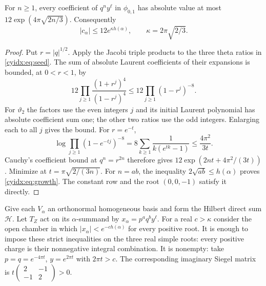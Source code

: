 \begin{lemma}\label{cyidx:lem:growth}
For \(n\geq1\), every coefficient of \(q^ny^\ell\)
in \(\phi_{0,1}\) has absolute value at most
\(12\exp(4\pi\sqrt{2n/3})\). Consequently
\begin{equation}\label{cyidx:eq:growth}
 |c_\alpha|\leq12e^{\kappa h(\alpha)},
 \qquad \kappa=2\pi\sqrt{2/3}.
\end{equation}
\end{lemma}
\begin{proof}
Put \(r=|q|^{1/2}\). Apply the Jacobi triple products
to the three theta ratios in \eqref{cyidx:eq:seed}.
The sum of absolute Laurent coefficients of their
expansions is bounded, at \(0<r<1\), by
\[
 12\prod_{j\geq1}\frac{(1+r^j)^4}{(1-r^j)^4}
       \leq12\prod_{j\geq1}(1-r^j)^{-8}.
\]
For \(\vartheta_2\) the factors use the even integers
\(j\) and its initial Laurent polynomial has absolute
coefficient sum one; the other two ratios use the odd
integers. Enlarging each to all \(j\) gives the bound.
For \(r=e^{-t}\),
\[
 \log\prod_{j\geq1}(1-e^{-tj})^{-8}
 =8\sum_{k\geq1}\frac1{k(e^{tk}-1)}
 \leq\frac{4\pi^2}{3t}.
\]
Cauchy's coefficient bound at \(q^n=r^{2n}\)
therefore gives \(12\exp(2nt+4\pi^2/(3t))\).
Minimize at \(t=\pi\sqrt{2/(3n)}\).
For \(n=ab\), the inequality \(2\sqrt{ab}\leq h(\alpha)\)
proves \eqref{cyidx:eq:growth}. The constant row and
the root \((0,0,-1)\) satisfy it directly.
\end{proof}

Give each \(V_\alpha\) an orthonormal homogeneous basis
and form the Hilbert direct sum \(\mathcal H\).
Let \(T_Z\) act on its \(\alpha\)-summand by
\(x_\alpha=p^aq^by^\ell\). For a real \(c>\kappa\)
consider the open chamber in which
\( |x_\alpha|<e^{-c h(\alpha)}\) for every positive root.
It is enough to impose these strict inequalities on the
three real simple roots: every positive charge is their
nonnegative integral combination. It is nonempty: take
\(p=q=e^{-4\pi t}\), \(y=e^{2\pi t}\) with
\(2\pi t>c\). The corresponding imaginary Siegel
matrix is \(t\left(\begin{smallmatrix}2&-1\\-1&2\end{smallmatrix}\right)>0\).

